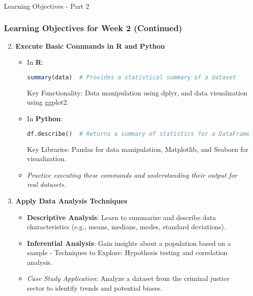 \documentclass[aspectratio=169]{beamer}
\begin{document}
\begin{frame}[fragile]{Learning Objectives - Part 2}
    \frametitle{Learning Objectives for Week 2 (Continued)}

    \begin{enumerate}
        \setcounter{enumi}{1} %
        \item \textbf{Execute Basic Commands in R and Python}
            \begin{itemize}
                \item In \textbf{R}:
                    \begin{lstlisting}[language=R]
summary(data)  # Provides a statistical summary of a dataset
                    \end{lstlisting}
                    Key Functionality: Data manipulation using dplyr, and data visualization using ggplot2.

                \item In \textbf{Python}:
                    \begin{lstlisting}[language=Python]
df.describe()  # Returns a summary of statistics for a DataFrame
                    \end{lstlisting}
                    Key Libraries: Pandas for data manipulation, Matplotlib, and Seaborn for visualization.
                    \item \textit{Practice executing these commands and understanding their output for real datasets.}
            \end{itemize}
        
        \item \textbf{Apply Data Analysis Techniques}
            \begin{itemize}
                \item \textbf{Descriptive Analysis}: Learn to summarize and describe data characteristics (e.g., means, medians, modes, standard deviations).
                
                \item \textbf{Inferential Analysis}: Gain insights about a population based on a sample - Techniques to Explore: Hypothesis testing and correlation analysis.
                
                \item \textit{Case Study Application}: Analyze a dataset from the criminal justice sector to identify trends and potential biases.
            \end{itemize}
    \end{enumerate}
\end{frame}
\end{document}
